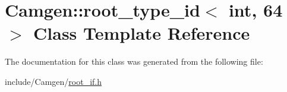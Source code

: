 \hypertarget{a00478}{\section{Camgen\-:\-:root\-\_\-type\-\_\-id$<$ int, 64 $>$ Class Template Reference}
\label{a00478}
}


The documentation for this class was generated from the following file\-:\begin{DoxyCompactItemize}
\item 
include/\-Camgen/\hyperlink{a00732}{root\-\_\-if.\-h}\end{DoxyCompactItemize}
